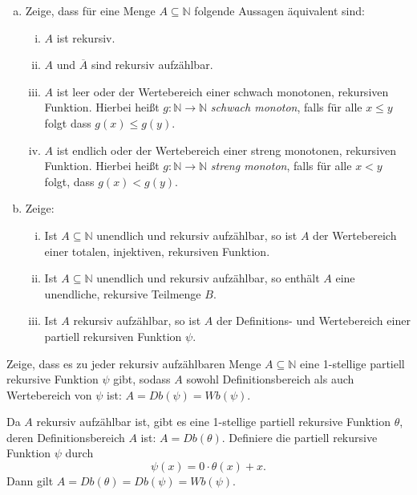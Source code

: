 \documentclass[german,headsepline]{scrartcl}
\theoremstyle{definition}
\begin{document}
	\begin{question}[subtitle={Blatt 13, 2015}]
		\begin{enumerate}[(a)]
			\item Zeige, dass für eine Menge $A\subseteq\mathbb{N}$ folgende Aussagen äquivalent sind:
				\begin{enumerate}[(i)]
					\item $A$ ist rekursiv.
					\item $A$ und $\overline{A}$ sind rekursiv aufzählbar.
					\item $A$ ist leer oder der Wertebereich einer schwach monotonen, rekursiven Funktion.
						Hierbei heißt $g:\mathbb{N}\to\mathbb{N}$ \emph{schwach monoton},
						falls für alle $x\leq y$ folgt dass $g(x)\leq g(y)$.
					\item $A$ ist endlich oder der Wertebereich einer streng monotonen, rekursiven Funktion.
						Hierbei heißt $g:\mathbb{N}\to\mathbb{N}$ \emph{streng monoton}, falls für alle $x<y$ folgt, dass $g(x)<g(y)$.
				\end{enumerate}
			\item Zeige:
				\begin{enumerate}[(i)]
					\item Ist $A\subseteq\mathbb{N}$ unendlich und rekursiv aufzählbar,
						so ist $A$ der Wertebereich einer totalen, injektiven, rekursiven Funktion.
					\item Ist $A\subseteq\mathbb{N}$ unendlich und rekursiv aufzählbar,
						so enthält $A$ eine unendliche, rekursive Teilmenge $B$.
					\item Ist $A$ rekursiv aufzählbar, so ist $A$ der Definitions- und Wertebereich einer partiell rekursiven Funktion $\psi$.
					
				\end{enumerate}
		\end{enumerate}
	\end{question}
	
	\begin{question}[subtitle={Klausur 2009}]
		Zeige, dass es zu jeder rekursiv aufzählbaren Menge $A\subseteq\mathbb{N}$ eine 1-stellige partiell rekursive Funktion $\psi$ gibt,
		sodass $A$ sowohl Definitionsbereich als auch Wertebereich von $\psi$ ist: $A=Db(\psi)=Wb(\psi)$.
	\end{question}
	\begin{solution}
		Da $A$ rekursiv aufzählbar ist, gibt es eine 1-stellige partiell rekursive Funktion $\theta$,
		deren Definitionsbereich $A$ ist: $A=Db(\theta)$.
		Definiere die partiell rekursive Funktion $\psi$ durch
		\[\psi(x)=0\cdot\theta(x)+x.\]
		Dann gilt $A=Db(\theta)=Db(\psi)=Wb(\psi)$.
	\end{solution}
	
\end{document}
